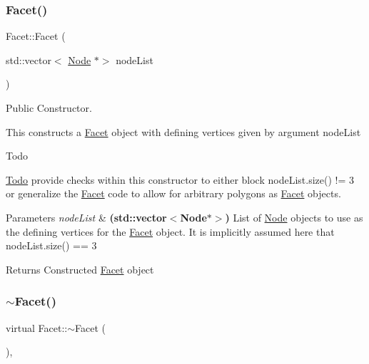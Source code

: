 \subsubsection{\texorpdfstring{Facet()}{Facet()}\hspace{0.1cm}{\footnotesize\ttfamily [2/2]}}
{\footnotesize\ttfamily Facet\+::\+Facet (\begin{DoxyParamCaption}\item[{std\+::vector$<$ \mbox{\hyperlink{class_node}{Node}} $\ast$$>$}]{node\+List }\end{DoxyParamCaption})}



Public Constructor. 

This constructs a \mbox{\hyperlink{class_facet}{Facet}} object with defining vertices given by argument node\+List \begin{DoxyRefDesc}{Todo}
\item[\mbox{\hyperlink{todo__todo000007}{Todo}}]provide checks within this constructor to either block node\+List.\+size() != 3 or generalize the \mbox{\hyperlink{class_facet}{Facet}} code to allow for arbitrary polygons as \mbox{\hyperlink{class_facet}{Facet}} objects. \end{DoxyRefDesc}

\begin{DoxyParams}{Parameters}
{\em node\+List} & {\bfseries (std\+::vector$<$\+Node$\ast$$>$)} List of \mbox{\hyperlink{class_node}{Node}} objects to use as the defining vertices for the \mbox{\hyperlink{class_facet}{Facet}} object. It is implicitly assumed here that node\+List.\+size() == 3 \\
\hline
\end{DoxyParams}
\begin{DoxyReturn}{Returns}
Constructed \mbox{\hyperlink{class_facet}{Facet}} object 
\end{DoxyReturn}
\mbox{\label{class_facet_af40042b9ad6c5a03127034f9d1c1e786}} 
\subsubsection{\texorpdfstring{$\sim$\+Facet()}{~Facet()}}
{\footnotesize\ttfamily virtual Facet\+::$\sim$\+Facet (\begin{DoxyParamCaption}{ }\end{DoxyParamCaption})\hspace{0.3cm}{\ttfamily [inline]}, {\ttfamily [virtual]}}



